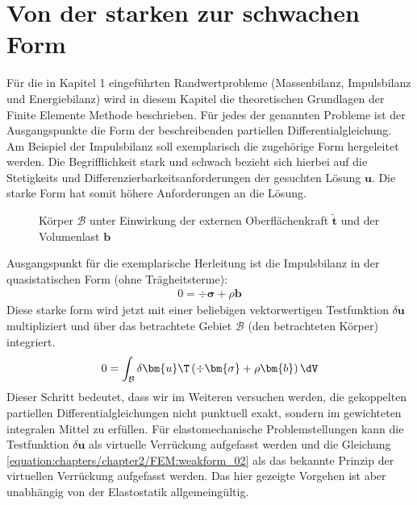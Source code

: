 \documentclass[letterpaper,10pt,german]{jupyterBook}
\let\sphinxpxdimen\pdfpxdimen\else\newdimen\sphinxpxdimen
\begin{document}
\section{Von der starken zur schwachen Form}
\label{\detokenize{chapters/chapter2/FEM:von-der-starken-zur-schwachen-form}}\label{\detokenize{chapters/chapter2/FEM::doc}}
\sphinxAtStartPar
Für die in Kapitel 1 eingeführten Randwertprobleme (Massenbilanz, Impulsbilanz und Energiebilanz) wird in diesem Kapitel die theoretischen Grundlagen der Finite Elemente Methode beschrieben. Für jedes der genannten Probleme ist der Ausgangspunkte die  Form der beschreibenden partiellen Differentialgleichung. Am Beispiel der Impulsbilanz soll exemplarisch die zugehörige  Form hergeleitet werden. Die Begrifflichkeit stark und schwach bezieht sich hierbei auf die Stetigkeits\sphinxhyphen{} und Differenzierbarkeitsanforderungen der gesuchten Lösung \(\bm{u}\). Die starke Form hat somit  höhere Anforderungen an die Lösung.

\begin{figure}[htbp]
\centering
\capstart

\noindent\sphinxincludegraphics[height=400\sphinxpxdimen]{{Impulsbilanz}.jpg}
\caption{Körper \(\mathcal{B}\) unter Einwirkung der externen Oberflächenkraft \(\tilde{\bm{t}}\) und der Volumenlast \(\bm{b}\)}\label{\detokenize{chapters/chapter2/FEM:impulsbilanz-fig}}\end{figure}

\sphinxAtStartPar
Ausgangspunkt für die exemplarische Herleitung ist die Impulsbilanz in der quasistatischen Form (ohne Trägheitsterme):
\begin{equation}\label{equation:chapters/chapter2/FEM:weakform_01}
\begin{split}0 = \div{\bm{\sigma}} + \rho \bm{b} \end{split}
\end{equation}
\sphinxAtStartPar
Diese starke form wird jetzt mit einer beliebigen vektorwertigen Testfunktion \(\delta \bm{u}\) multipliziert und über das betrachtete Gebiet \(\mathcal{B}\) (den betrachteten Körper) integriert.
\begin{equation}\label{equation:chapters/chapter2/FEM:weakform_02}
\begin{split}0 = \int_{\mathcal{B}} \delta  \bm{u}\T \left(\div{\bm{\sigma}} + \rho \bm{b} \right) \dV\end{split}
\end{equation}
\sphinxAtStartPar
Dieser Schritt bedeutet, dass wir im Weiteren versuchen werden, die gekoppelten partiellen Differentialgleichungen nicht punktuell exakt, sondern im gewichteten integralen Mittel zu erfüllen. Für elastomechanische Problemstellungen kann die Testfunktion \(\delta \bm{u}\) als virtuelle Verrückung aufgefasst werden und die Gleichung \eqref{equation:chapters/chapter2/FEM:weakform_02} als das bekannte Prinzip der virtuellen Verrückung aufgefasst werden. Das hier gezeigte Vorgehen ist aber unabhängig von der Elastostatik allgemeingültig.
\end{document}

